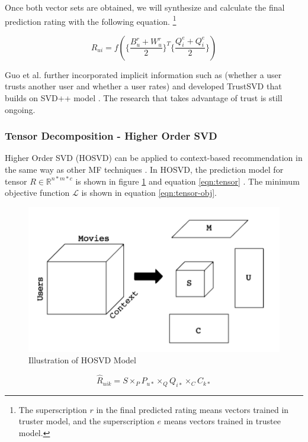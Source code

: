 \documentclass[letter paper, 11pt]{article}
\begin{document}
	Once both vector sets are obtained, we will synthesize and calculate the final prediction rating with the following equation. \footnote{The superscription $r$ in the final predicted rating means vectors trained in truster model, and the superscription $e$ means vectors trained in trustee model. }

	\begin{equation}
		\tag*{final prediction rating by TrustMF}
		R_{ui} = f(\{\dfrac{B_u^r + W_u^r}{2}\}^T \{\dfrac{Q_i^e + Q_i^e}{2}\})
	\end{equation}

	Guo et al. further incorporated implicit information such as (whether a user trusts another user and whether a user rates) and developed TrustSVD that builds on SVD++ model \cite{TrustSVD}. The research that takes advantage of trust is still ongoing.
	
	\subsubsection{Tensor Decomposition - Higher Order SVD}
	Higher Order SVD (HOSVD) can be applied to context-based recommendation in the same way as other MF techniques \cite{tensor}. In HOSVD, the prediction model for tensor $R \in \mathbb{R}^{n * m * c}$ is shown in figure \ref{fig:tensor} and equation \ref{eqn:tensor} \cite{latentFactor-RS}. The minimum objective function $\mathcal{L}$ is shown in equation \ref{eqn:tensor-obj}.
	
	\begin{figure}
		\centering
		\caption{Illustration of HOSVD Model \cite{tensor}}
		\label{fig:tensor}
		\includegraphics{tensor.png}
	\end{figure}
	
	\begin{equation}
		\label{eqn:tensor}
		\hat{R}_{uik} = S \times_P P_{u*} \times_Q Q_{i*} \times_C C_{k*}
	\end{equation}
	
\end{document}
